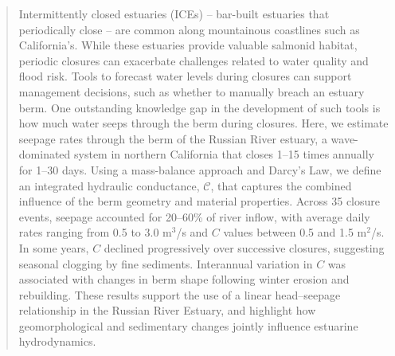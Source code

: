 \documentclass[preprint,12pt,authoryear]{elsarticle}
\begin{document}
\begin{frontmatter}
\begin{abstract}

 
 Intermittently closed estuaries (ICEs) -- bar-built estuaries that periodically close --  are common along mountainous coastlines such as California's. While these estuaries provide valuable salmonid habitat, periodic closures can exacerbate challenges related to water quality and flood risk. Tools to forecast water levels during closures can support management decisions, such as whether to manually breach an estuary berm. One outstanding knowledge gap in the development of such tools is how much water seeps through the berm during closures.
Here, we estimate seepage rates through the berm of the Russian River estuary, a wave-dominated system in northern California that closes 1–15 times annually for 1–30 days. Using a mass-balance approach and Darcy’s Law, we define an integrated hydraulic conductance, $\mathcal{C}$, that captures the combined influence of the berm geometry and material properties. Across 35 closure events, seepage accounted for 20–60\% of river inflow, with average daily rates ranging from 0.5 to 3.0 m$^3$/s and $C$ values between 0.5 and 1.5 m$^2$/s. In some years, $C$ declined progressively over successive closures, suggesting seasonal clogging by fine sediments. Interannual variation in $C$ was associated with changes in berm shape following winter erosion and rebuilding. These results support the use of a linear head–seepage relationship in the Russian River Estuary, and highlight how geomorphological and sedimentary changes jointly influence estuarine hydrodynamics.


\end{abstract}



\end{frontmatter}
\end{document}
